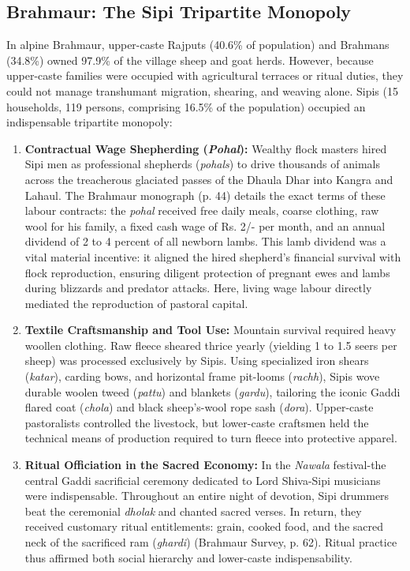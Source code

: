 \documentclass[11pt,a4paper]{article}
\begin{document}
\subsection{Brahmaur: The Sipi Tripartite Monopoly}
In alpine Brahmaur, upper-caste Rajputs (40.6\% of population) and Brahmans (34.8\%) owned 97.9\% of the village sheep and goat herds. However, because upper-caste families were occupied with agricultural terraces or ritual duties, they could not manage transhumant migration, shearing, and weaving alone. Sipis (15 households, 119 persons, comprising 16.5\% of the population) occupied an indispensable tripartite monopoly:
\begin{enumerate}[leftmargin=*]
    \item \textbf{Contractual Wage Shepherding (\textit{Pohal}):} Wealthy flock masters hired Sipi men as professional shepherds (\textit{pohals}) to drive thousands of animals across the treacherous glaciated passes of the Dhaula Dhar into Kangra and Lahaul. The Brahmaur monograph (p. 44) details the exact terms of these labour contracts: the \textit{pohal} received free daily meals, coarse clothing, raw wool for his family, a fixed cash wage of Rs. 2/- per month, and an annual dividend of 2 to 4 percent of all newborn lambs. This lamb dividend was a vital material incentive: it aligned the hired shepherd's financial survival with flock reproduction, ensuring diligent protection of pregnant ewes and lambs during blizzards and predator attacks. Here, living wage labour directly mediated the reproduction of pastoral capital.
    \item \textbf{Textile Craftsmanship and Tool Use:} Mountain survival required heavy woollen clothing. Raw fleece sheared thrice yearly (yielding 1 to 1.5 seers per sheep) was processed exclusively by Sipis. Using specialized iron shears (\textit{katar}), carding bows, and horizontal frame pit-looms (\textit{rachh}), Sipis wove durable woolen tweed (\textit{pattu}) and blankets (\textit{gardu}), tailoring the iconic Gaddi flared coat (\textit{chola}) and black sheep's-wool rope sash (\textit{dora}). Upper-caste pastoralists controlled the livestock, but lower-caste craftsmen held the technical means of production required to turn fleece into protective apparel.
    \item \textbf{Ritual Officiation in the Sacred Economy:} In the \textit{Nawala} festival-the central Gaddi sacrificial ceremony dedicated to Lord Shiva-Sipi musicians were indispensable. Throughout an entire night of devotion, Sipi drummers beat the ceremonial \textit{dholak} and chanted sacred verses. In return, they received customary ritual entitlements: grain, cooked food, and the sacred neck of the sacrificed ram (\textit{ghardi}) (Brahmaur Survey, p. 62). Ritual practice thus affirmed both social hierarchy and lower-caste indispensability.
\end{enumerate}
\end{document}
